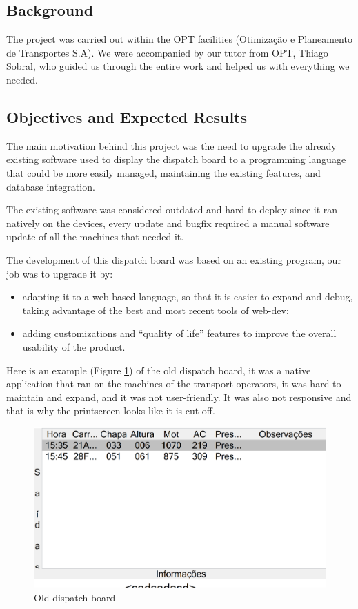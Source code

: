 \documentclass[10pt]{article}
\begin{document}
    \subsection{Background}
    The project was carried out within the OPT facilities (Otimização e Planeamento de Transportes S.A). We were accompanied by our tutor from OPT, Thiago Sobral, who guided us through the entire work and helped us with everything we needed.

    \subsection{Objectives and Expected Results}
        The main motivation behind this project was the need to upgrade the already existing software used to display the dispatch board to a programming language that could be more easily managed, maintaining the existing features, and database integration.

        The existing software was considered outdated and hard to deploy since it ran natively on the devices, every update and bugfix required a manual software update of all the machines that needed it.

        The development of this dispatch board was based on an existing program, our job was to upgrade it by:
        \begin{itemize}
            \item adapting it to a web-based language, so that it is easier to expand and debug, taking advantage of the best and most recent tools of web-dev;
            \item adding customizations and “quality of life” features to improve the overall usability of the product.
        \end{itemize}

        Here is an example (Figure \ref{fig:old_dispatch_board}) of the old dispatch board, it was a native application that ran on the machines of the transport operators, it was hard to maintain and expand, and it was not user-friendly. It was also not responsive and that is why the printscreen looks like it is cut off.
        \vfill
        \begin{figure}[!ht]
            \centering
            \includegraphics[width=1\textwidth]{old_dispatch_board}
            \caption{Old dispatch board}
            \label{fig:old_dispatch_board}
        \end{figure}
\end{document}

